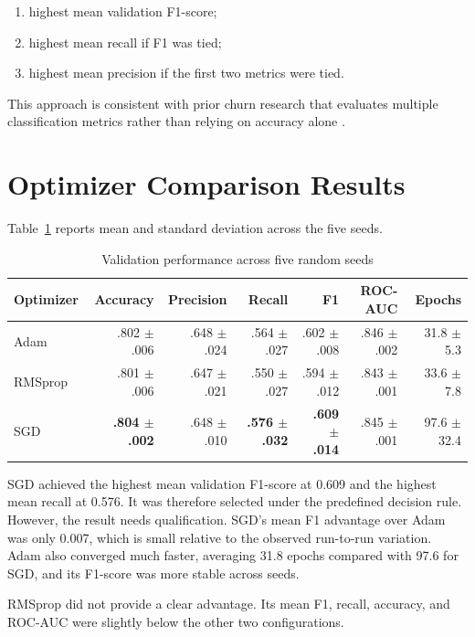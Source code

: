 \documentclass[11pt]{article}
\begin{document}
\begin{enumerate}[leftmargin=*]
    \item highest mean validation F1-score;
    \item highest mean recall if F1 was tied;
    \item highest mean precision if the first two metrics were tied.
\end{enumerate}

This approach is consistent with prior churn research that evaluates multiple classification metrics rather than relying on accuracy alone \citep{vafeiadis2015,amin2019}.

\section{Optimizer Comparison Results}

Table~\ref{tab:optimizers} reports mean and standard deviation across the five seeds.

\begin{table}[H]
\centering
\caption{Validation performance across five random seeds}
\label{tab:optimizers}
\small
\begin{tabular}{lrrrrrr}
\toprule
\textbf{Optimizer} & \textbf{Accuracy} & \textbf{Precision} & \textbf{Recall} & \textbf{F1} & \textbf{ROC-AUC} & \textbf{Epochs}\\
\midrule
Adam & .802 $\pm$ .006 & .648 $\pm$ .024 & .564 $\pm$ .027 & .602 $\pm$ .008 & .846 $\pm$ .002 & 31.8 $\pm$ 5.3\\
RMSprop & .801 $\pm$ .006 & .647 $\pm$ .021 & .550 $\pm$ .027 & .594 $\pm$ .012 & .843 $\pm$ .001 & 33.6 $\pm$ 7.8\\
SGD & \textbf{.804 $\pm$ .002} & .648 $\pm$ .010 & \textbf{.576 $\pm$ .032} & \textbf{.609 $\pm$ .014} & .845 $\pm$ .001 & 97.6 $\pm$ 32.4\\
\bottomrule
\end{tabular}
\end{table}

SGD achieved the highest mean validation F1-score at 0.609 and the highest mean recall at 0.576. It was therefore selected under the predefined decision rule. However, the result needs qualification. SGD's mean F1 advantage over Adam was only 0.007, which is small relative to the observed run-to-run variation. Adam also converged much faster, averaging 31.8 epochs compared with 97.6 for SGD, and its F1-score was more stable across seeds.

RMSprop did not provide a clear advantage. Its mean F1, recall, accuracy, and ROC-AUC were slightly below the other two configurations.
\end{document}
